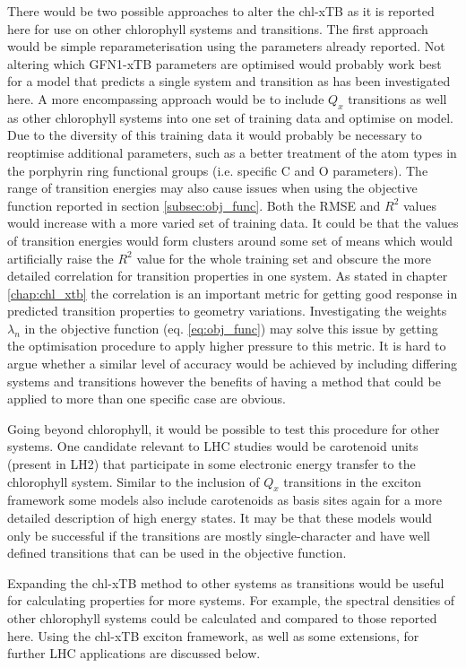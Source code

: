 There would be two possible approaches to alter the chl-xTB as it is reported here 
for use on other chlorophyll systems and transitions. The first approach would be 
simple reparameterisation using the parameters already reported. Not altering which
GFN1-xTB parameters are optimised would probably work best for a model that predicts
a single system and transition as has been investigated here. A more encompassing 
approach would be to include $Q_x$ transitions as well as other chlorophyll systems
into one set of training data and optimise on model. Due to the diversity of this
training data it would probably be necessary to reoptimise additional parameters,
such as a better treatment of the atom types in the porphyrin ring functional groups 
(i.e. specific C and O parameters). The range of transition energies may also cause
issues when using the objective function reported in section \ref{subsec:obj_func}.
Both the RMSE and $R^2$ values would increase with a more varied set of training 
data. It could be that the values of transition energies would form clusters around
some set of means which would artificially raise the $R^2$ value for the whole training
set and obscure the more detailed correlation for transition properties in one system.
As stated in chapter \ref{chap:chl_xtb} the correlation is an important metric for
getting good response in predicted transition properties to geometry variations.
Investigating the weights $\lambda_n$ in the objective function (eq. \ref{eq:obj_func})
may solve this issue by getting the optimisation procedure to apply higher pressure
to this metric. It is hard to argue whether a similar level of accuracy would be
achieved by including differing systems and transitions however the benefits of 
having a method that could be applied to more than one specific case are obvious.

Going beyond chlorophyll, it would be possible to test this procedure for other 
systems. One candidate relevant to LHC studies would be carotenoid units (present
in LH2) that participate in some electronic energy transfer to the chlorophyll system.
Similar to the inclusion of $Q_x$ transitions in the exciton framework some models
also include carotenoids as basis sites again for a more detailed description of
high energy states. It may be that these models would only be successful if the 
transitions are mostly single-character and have well defined transitions that can
be used in the objective function. 

Expanding the chl-xTB method to other systems as transitions would be useful for
calculating properties for more systems. For example, the spectral densities of 
other chlorophyll systems could be calculated and compared to those reported here.
Using the chl-xTB exciton framework, as well as some extensions, for further LHC
applications are discussed below.

